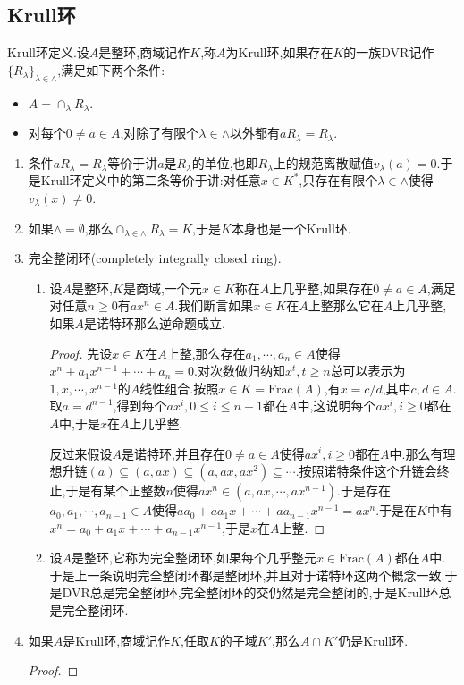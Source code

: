 \subsection{Krull环}

Krull环定义.设$A$是整环,商域记作$K$,称$A$为Krull环,如果存在$K$的一族DVR记作$\{R_{\lambda}\}_{\lambda\in\wedge}$,满足如下两个条件:
\begin{itemize}
	\item $A=\cap_{\lambda}R_{\lambda}$.
	\item 对每个$0\not=a\in A$,对除了有限个$\lambda\in\wedge$以外都有$aR_{\lambda}=R_{\lambda}$.
\end{itemize}
\begin{enumerate}
	\item 条件$aR_{\lambda}=R_{\lambda}$等价于讲$a$是$R_{\lambda}$的单位,也即$R_{\lambda}$上的规范离散赋值$v_{\lambda}(a)=0$.于是Krull环定义中的第二条等价于讲:对任意$x\in K^*$,只存在有限个$\lambda\in\wedge$使得$v_{\lambda}(x)\not=0$.
	\item 如果$\wedge=\emptyset$,那么$\cap_{\lambda\in\wedge}R_{\lambda}=K$,于是$K$本身也是一个Krull环.
	\item 完全整闭环(completely integrally closed ring).
	\begin{enumerate}
		\item 设$A$是整环,$K$是商域,一个元$x\in K$称在$A$上几乎整,如果存在$0\not=a\in A$,满足对任意$n\ge0$有$ax^n\in A$.我们断言如果$x\in K$在$A$上整那么它在$A$上几乎整,如果$A$是诺特环那么逆命题成立.
		\begin{proof}
			
			先设$x\in K$在$A$上整,那么存在$a_1,\cdots,a_n\in A$使得$x^n+a_1x^{n-1}+\cdots+a_n=0$.对次数做归纳知$x^t,t\ge n$总可以表示为$1,x,\cdots,x^{n-1}$的$A$线性组合.按照$x\in K=\mathrm{Frac}(A)$,有$x=c/d$,其中$c,d\in A$.取$a=d^{n-1}$,得到每个$ax^i,0\le i\le n-1$都在$A$中,这说明每个$ax^i,i\ge0$都在$A$中,于是$x$在$A$上几乎整.
			
			\qquad
			
			反过来假设$A$是诺特环,并且存在$0\not=a\in A$使得$ax^i,i\ge0$都在$A$中.那么有理想升链$(a)\subseteq(a,ax)\subseteq(a,ax,ax^2)\subseteq\cdots$.按照诺特条件这个升链会终止,于是有某个正整数$n$使得$ax^n\in(a,ax,\cdots,ax^{n-1})$.于是存在$a_0,a_1,\cdots,a_{n-1}\in A$使得$aa_0+aa_1x+\cdots+aa_{n-1}x^{n-1}=ax^n$.于是在$K$中有$x^n=a_0+a_1x+\cdots+a_{n-1}x^{n-1}$,于是$x$在$A$上整.
		\end{proof}
	    \item 设$A$是整环,它称为完全整闭环,如果每个几乎整元$x\in\mathrm{Frac}(A)$都在$A$中.于是上一条说明完全整闭环都是整闭环,并且对于诺特环这两个概念一致.于是DVR总是完全整闭环,完全整闭环的交仍然是完全整闭的,于是Krull环总是完全整闭环.
	\end{enumerate}
    \item 如果$A$是Krull环,商域记作$K$,任取$K$的子域$K'$,那么$A\cap K'$仍是Krull环.
    \begin{proof}
    	

\end{proof}
\end{enumerate}
